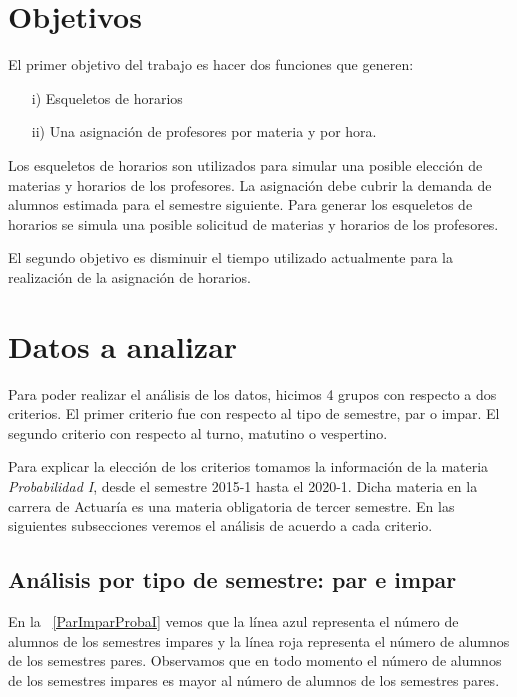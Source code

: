 \section{Objetivos}

El primer objetivo del trabajo es hacer dos funciones que generen:
  
  \begin{enumerate}
\item[i)] Esqueletos de horarios

\item[ii)] Una asignación de profesores por materia y por hora.
\end{enumerate}


Los esqueletos de horarios son utilizados para simular una posible elección de materias y horarios de los profesores. La asignación debe cubrir la demanda de alumnos estimada para el semestre siguiente. Para generar los esqueletos de horarios se simula una posible solicitud de materias y horarios de los profesores.

El segundo objetivo es disminuir el tiempo utilizado actualmente para la realización de la asignación de horarios.


\section{Datos a analizar} \label{DatosAnalizar}

Para poder realizar el análisis de los datos, hicimos 4 grupos con respecto a dos criterios. El primer criterio fue con respecto al tipo de semestre, par o impar. El segundo criterio con respecto al turno, matutino o vespertino.

Para explicar la elección de los criterios tomamos la información de la materia \textit{Probabilidad I}, desde el semestre 2015-1 hasta el 2020-1. Dicha materia en la carrera de Actuaría es una materia obligatoria de tercer semestre. En las siguientes subsecciones veremos el análisis de acuerdo a cada criterio.

\subsection{Análisis por tipo de semestre: par e impar}

En la \figurename{~\ref{ParImparProbaI}} vemos que la línea azul representa el número de alumnos de los semestres impares y la línea roja representa el número de alumnos de los semestres pares. Observamos que en todo momento el número de alumnos de los semestres impares es mayor al número de alumnos de los semestres pares.

